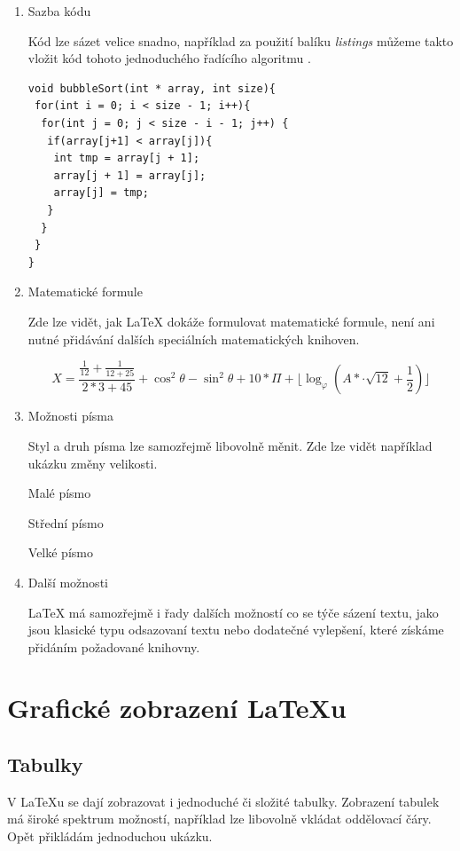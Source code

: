 \documentclass[a4paper,11pt]{article}
\begin{document}
\begin{enumerate}
\item{Sazba kódu}

Kód lze sázet velice snadno, například za použití balíku \textit{listings} můžeme takto vložit kód tohoto jednoduchého řadícího algoritmu \cite{Bubble}.

\lstset{language=C++}
\begin{lstlisting}
void bubbleSort(int * array, int size){
 for(int i = 0; i < size - 1; i++){
  for(int j = 0; j < size - i - 1; j++)	{
   if(array[j+1] < array[j]){
    int tmp = array[j + 1];
    array[j + 1] = array[j];
    array[j] = tmp;
   }  
  }  
 }  
}    
\end{lstlisting}

\item{Matematické formule}

Zde lze vidět, jak LaTeX dokáže formulovat matematické formule, není ani nutné přidávání dalších speciálních matematických knihoven.

	\[
		\textit{X}=\frac{\frac{1}{12}+\frac{1}{12+25}}{2*3+45}+\cos^2\theta-\sin^2\theta+10*\Pi+\lfloor\log_\varphi(\textit{A}*\cdot\sqrt{12}+\frac{1}{2})\rfloor
	\]

\item{Možnosti písma}

Styl a druh písma lze samozřejmě libovolně měnit. Zde lze vidět například ukázku změny velikosti.

{\tiny Malé písmo}

{\footnotesize Střední písmo}

{\Large Velké písmo}

\item{Další možnosti}

LaTeX má samozřejmě i řady dalších možností co se týče sázení textu, jako jsou klasické typu odsazovaní textu nebo dodatečné vylepšení, které získáme přidáním požadované knihovny.

\end{enumerate}

\section{Grafické zobrazení \LaTeX u}
\subsection{Tabulky}
V LaTeXu se dají zobrazovat i jednoduché či složité tabulky. Zobrazení tabulek má široké spektrum možností, například lze libovolně vkládat oddělovací čáry. Opět přikládám jednoduchou ukázku.
\end{document}
